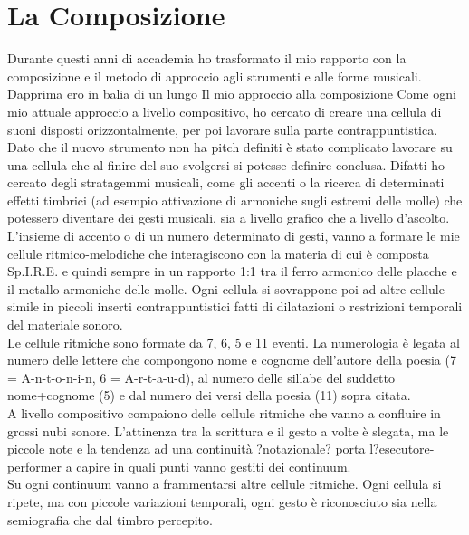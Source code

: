 
\chapter{La Composizione}
\label{chp:La Composizione}

Durante questi anni di accademia ho trasformato il mio rapporto con la composizione e il metodo di approccio agli strumenti e alle forme musicali. Dapprima ero in balia di un lungo
Il mio approccio alla composizione 
Come ogni mio attuale approccio a livello compositivo, ho cercato di creare una cellula di suoni disposti orizzontalmente, per poi lavorare sulla parte contrappuntistica. Dato che il nuovo strumento non ha pitch definiti è stato complicato lavorare su una cellula che al finire del suo svolgersi si potesse definire conclusa. Difatti ho cercato degli stratagemmi musicali, come gli accenti o la ricerca di determinati effetti timbrici (ad esempio attivazione di armoniche sugli estremi delle molle) che potessero diventare dei gesti musicali, sia a livello grafico che a livello d'ascolto. L'insieme di accento o di un numero determinato di gesti, vanno a formare le mie cellule ritmico-melodiche che interagiscono con la materia di cui è composta Sp.I.R.E. e quindi sempre in un rapporto 1:1 tra il ferro armonico delle placche e il metallo armoniche delle molle. Ogni cellula si sovrappone poi ad altre cellule simile in piccoli inserti contrappuntistici fatti di dilatazioni o restrizioni temporali del materiale sonoro. \\ 
Le cellule ritmiche sono formate da 7, 6, 5 e 11 eventi. La numerologia è legata al numero delle lettere che compongono nome e cognome dell'autore della poesia (7 = A-n-t-o-n-i-n, 6 = A-r-t-a-u-d), al numero delle sillabe del suddetto nome+cognome (5) e dal numero dei versi della poesia (11) sopra citata. \\
A livello compositivo compaiono delle cellule ritmiche che vanno a confluire in grossi nubi sonore. L'attinenza tra la scrittura e il gesto a volte è slegata, ma le piccole note e la tendenza ad una continuità ?notazionale? porta l?esecutore-performer a capire in quali punti vanno gestiti dei continuum. \\
Su ogni continuum vanno a frammentarsi altre cellule ritmiche. Ogni cellula si ripete, ma con piccole variazioni temporali, ogni gesto è riconosciuto sia nella semiografia che dal timbro percepito.
